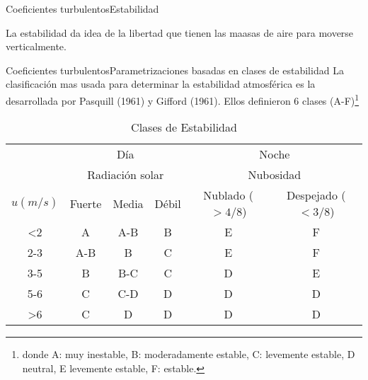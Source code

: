 \begin{frame}{Coeficientes turbulentos}{Estabilidad}

La estabilidad da idea de la libertad que tienen las maasas de aire para moverse verticalmente.

\begin{center}
\end{center}

\end{frame}
 
\begin{frame}{Coeficientes turbulentos}{Parametrizaciones basadas en clases de estabilidad}
La clasificación mas usada para determinar la estabilidad atmosférica es la desarrollada por Pasquill (1961) y Gifford (1961). Ellos definieron 6 clases (A-F)\footnote{donde A: muy inestable, B: moderadamente estable, C: levemente estable, D neutral, E levemente estable, F: estable.}
 
\begin{table}[]
    \centering
\begin{tabular}{| c | c c c | c c |}
\hline
& \multicolumn{3}{c|}{Día} & \multicolumn{2}{c|}{Noche} \\
& \multicolumn{3}{c|}{Radiación solar} & \multicolumn{2}{c|}{Nubosidad} \\
$u (m/s)$ & Fuerte & Media & Débil & Nublado ($> 4/8$) & Despejado ($<3/8$) \\ \hline
<2  & A   & A-B  & B & E & F \\ 
2-3 & A-B & B    & C & E & F \\ 
3-5 & B   & B-C  & C & D & E \\ 
5-6 & C   & C-D  & D & D & D \\ 
>6  & C   & D    & D & D & D \\ \hline
\end{tabular}
    \caption{Clases de Estabilidad}
    \label{tab:my_label}
\end{table}
\end{frame}

